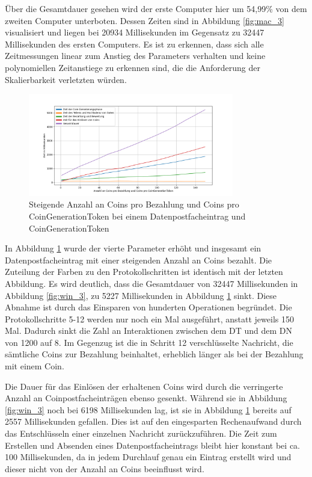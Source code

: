 \documentclass[
	fontsize=11pt,
	headings=small,
	parskip=half,           %
	bibliography=totoc,
	numbers=noenddot,       %
	open=any,               %
]{scrreprt}
\begin{document}
Über die Gesamtdauer gesehen wird der erste Computer hier um 54,99\% von dem zweiten Computer unterboten. Dessen Zeiten sind in Abbildung \ref{fig:mac_3} visualisiert und liegen bei 20934 Millisekunden im Gegensatz zu 32447 Millisekunden des ersten Computers. Es ist zu erkennen, dass sich alle Zeitmessungen linear zum Anstieg des Parameters verhalten und keine polynomiellen Zeitanstiege zu erkennen sind, die die Anforderung der Skalierbarkeit verletzten würden.


\begin{figure}[H]
    \caption{Steigende Anzahl an Coins pro Bezahlung und Coins pro CoinGenerationToken bei einem Datenpostfacheintrag und CoinGenerationToken}
    \label{fig:win_4}
    \centering
    \includegraphics[width=0.8\textwidth]{figure_win_4.png}
\end{figure}
In Abbildung \ref{fig:win_4} wurde der vierte Parameter erhöht und insgesamt ein Datenpostfacheintrag mit einer steigenden Anzahl an Coins bezahlt. Die Zuteilung der Farben zu den Protokollschritten ist identisch mit der letzten Abbildung. Es wird deutlich, dass die Gesamtdauer von 32447 Millisekunden in Abbildung \ref{fig:win_3}, zu 5227 Millisekunden in Abbildung \ref{fig:win_4} sinkt. Diese Abnahme ist durch das Einsparen von hunderten Operationen begründet. Die Protokollschritte 5-12 werden nur noch ein Mal ausgeführt, anstatt jeweils 150 Mal. Dadurch sinkt die Zahl an Interaktionen zwischen dem DT und dem DN von 1200 auf 8. Im Gegenzug ist die in Schritt 12 verschlüsselte Nachricht, die sämtliche Coins zur Bezahlung beinhaltet, erheblich länger als bei der Bezahlung mit einem Coin.

Die Dauer für das Einlösen der erhaltenen Coins wird durch die verringerte Anzahl an Coinpostfacheinträgen ebenso gesenkt. Während sie in Abbildung \ref{fig:win_3} noch bei 6198 Millisekunden lag, ist sie in Abbildung \ref{fig:win_4} bereits auf 2557 Millisekunden gefallen. Dies ist auf den eingesparten Rechenaufwand durch das Entschlüsseln einer einzelnen Nachricht zurückzuführen. Die Zeit zum Erstellen und Absenden eines Datenpostfacheintrags bleibt hier konstant bei ca. 100 Millisekunden, da in jedem Durchlauf genau ein Eintrag erstellt wird und dieser nicht von der Anzahl an Coins beeinflusst wird.
\end{document}
